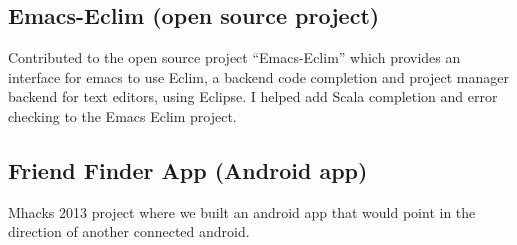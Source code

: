 \documentclass[5pt]{resume}
\begin{document}
\subsection{\textbf{Emacs-Eclim (open source project)}}
{\color{default} Contributed to the open source project “Emacs-Eclim”
  which provides an interface for emacs to use Eclim, a backend code completion
  and project manager backend for text editors, using Eclipse. I helped add
  Scala completion and error checking to the Emacs Eclim project. }
\subsection{\textbf{Friend Finder App (Android app)}} 
{\color{default} Mhacks 2013 project where we built an android app that
  would point in the direction of another connected android.}
\\
\end{document}
